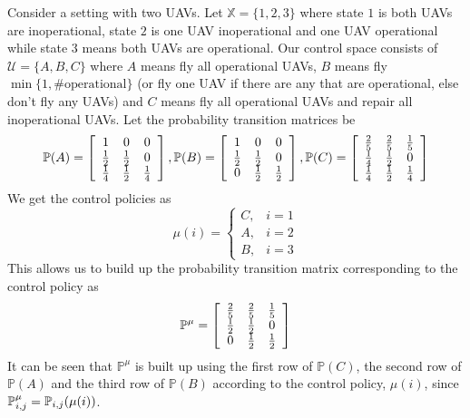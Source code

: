 \begin{example}
Consider a setting with two UAVs. Let $\mathbb{X}=\{1,2,3\}$ where state $1$ is both UAVs are inoperational, state $2$ is one UAV inoperational and one UAV operational while state $3$ means both UAVs are operational. Our control space consists of $\mathcal{U} = \{A,B,C\}$ where $A$ means fly all operational UAVs, $B$ means fly $\min\{1, \#\text{operational}\}$ (or fly one UAV if there are any that are operational, else don't fly any UAVs) and $C$ means fly all operational UAVs and repair all inoperational UAVs. Let the probability transition matrices be
\begin{align*}
\begin{split}
\mathbb{P}(A) = \left[\begin{array}{c c c} 1 & 0 & 0 \\ \frac{1}{2} & \frac{1}{2} & 0 \\ \frac{1}{4} & \frac{1}{2} & \frac{1}{4} \end{array}\right],
\mathbb{P}(B) = \left[\begin{array}{c c c} 1 & 0 & 0 \\ \frac{1}{2} & \frac{1}{2} & 0 \\ 0 & \frac{1}{2} & \frac{1}{2} \end{array}\right],
\mathbb{P}(C) = \left[\begin{array}{c c c} \frac{2}{5} & \frac{2}{5} & \frac{1}{5} \\ \frac{1}{4} & \frac{1}{2} & 0 \\ \frac{1}{4} & \frac{1}{2} & \frac{1}{4} \end{array}\right]
\end{split}
\end{align*}
We get the control policies as
$$\mu(i) = \begin{cases} C, & i=1 \\ A, & i=2 \\ B, & i=3 \end{cases}$$
This allows us to build up the probability transition matrix corresponding to the control policy as
$$\mathbb{P}^\mu = \left[\begin{array}{c c c} \frac{2}{5} & \frac{2}{5} & \frac{1}{5} \\ \frac{1}{2} & \frac{1}{2} & 0 \\ 0 & \frac{1}{2} & \frac{1}{2} \end{array}\right]$$
It can be seen that $\mathbb{P}^\mu$ is built up using the first row of $\mathbb{P}(C)$, the second row of $\mathbb{P}(A)$ and the third row of $\mathbb{P}(B)$ according to the control policy, $\mu(i)$, since $\mathbb{P}_{i,j}^\mu=\mathbb{P}_{i,j}(\mu(i))$.


\end{example}
